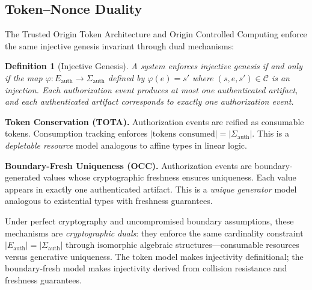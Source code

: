 \documentclass[11pt,letterpaper]{article}
\theoremstyle{occplain}
\newtheorem{definition}{Definition}[section]
\theoremstyle{occremark}
\newcommand{\Sigauth}{\Sigma_{\mathrm{auth}}}
\newcommand{\Eauth}{E_{\mathrm{auth}}}
\begin{document}
\subsection{Token--Nonce Duality}
\label{sec:duality}

The Trusted Origin Token Architecture and Origin Controlled Computing enforce the same injective genesis invariant through dual mechanisms:

\begin{definition}[Injective Genesis]
\label{def:injective-genesis}
A system enforces injective genesis if and only if the map $\varphi : \Eauth \rightarrow \Sigauth$ defined by $\varphi(e) = s'$ where $(s, e, s') \in \mathcal{C}$ is an injection. Each authorization event produces at most one authenticated artifact, and each authenticated artifact corresponds to exactly one authorization event.
\end{definition}

\textbf{Token Conservation (TOTA).} Authorization events are reified as consumable tokens. Consumption tracking enforces $|\text{tokens consumed}| = |\Sigauth|$. This is a \emph{depletable resource} model analogous to affine types in linear logic.

\textbf{Boundary-Fresh Uniqueness (OCC).} Authorization events are boundary-generated values whose cryptographic freshness ensures uniqueness. Each value appears in exactly one authenticated artifact. This is a \emph{unique generator} model analogous to existential types with freshness guarantees.

Under perfect cryptography and uncompromised boundary assumptions, these mechanisms are \emph{cryptographic duals}: they enforce the same cardinality constraint $|\Eauth| = |\Sigauth|$ through isomorphic algebraic structures---consumable resources versus generative uniqueness. The token model makes injectivity definitional; the boundary-fresh model makes injectivity derived from collision resistance and freshness guarantees.
\end{document}
